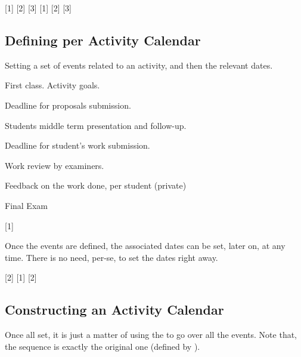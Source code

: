 \documentclass[10pt]{article}
\begin{document}
[1]
[2]
[3]
[1]
[2]
[3]

\subsection{Defining per Activity Calendar}
Setting a set of events related to an activity, and then the relevant dates.


\begin{codestore}

    {First class. Activity goals.}

    {Deadline for proposals submission.}

    {Students middle term presentation and follow-up.  }

    {Deadline for student's work submission.}

    {Work review by examiners.}

    {Feedback on the work done, per student (private)}

    {Final Exam}
\end{codestore}

\begin{codestore}

\end{codestore}


[1]

Once the events are defined, the associated dates can be set, later on, at any time. There is no need, per-se, to set the dates right away.

[2]
[1]
[2]


\subsection{Constructing an Activity Calendar}
Once all set, it is just a matter of using the \tsobj{\ActivityCalendarIterate} to go over all the events. Note that, the sequence is exactly the original one (defined by \tsobj{\ActivitySetNewEvent}).
\end{document}
